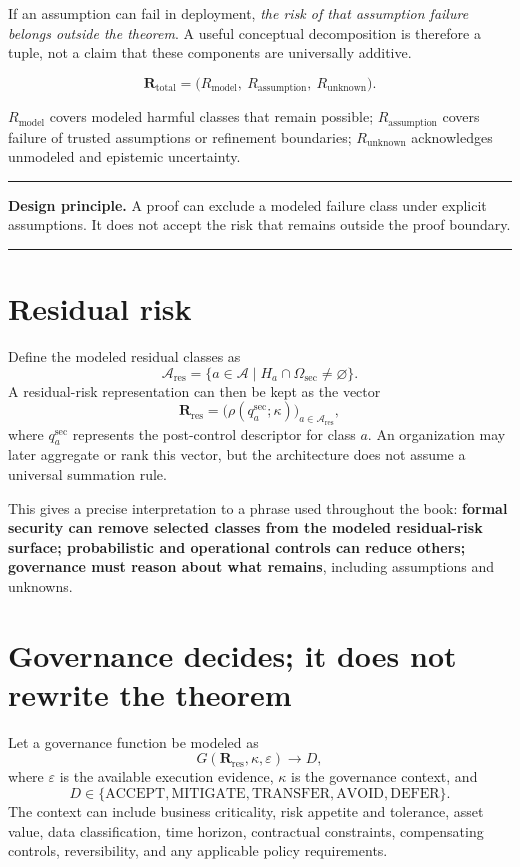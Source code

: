 \documentclass[10pt,oneside,openany]{book}
\newcommand{\principle}[1]{%
  \vspace{4pt}
  \noindent\begin{minipage}{\linewidth}
  \hrule\vspace{5pt}
  \small\sffamily\raggedright\textbf{Design principle.} #1
  \vspace{5pt}\hrule
  \end{minipage}\vspace{4pt}
}
\begin{document}
If an assumption can fail in deployment, \emph{the risk of that assumption failure belongs outside the theorem}. A useful conceptual decomposition is therefore a tuple, not a claim that these components are universally additive.
\begin{formulabox}
\[
\mathbf{R}_{\mathrm{total}}=\bigl(R_{\mathrm{model}},\ R_{\mathrm{assumption}},\ R_{\mathrm{unknown}}\bigr).
\]
\end{formulabox} $R_{\mathrm{model}}$ covers modeled harmful classes that remain possible; $R_{\mathrm{assumption}}$ covers failure of trusted assumptions or refinement boundaries; $R_{\mathrm{unknown}}$ acknowledges unmodeled and epistemic uncertainty.

\principle{A proof can exclude a modeled failure class under explicit assumptions. It does not accept the risk that remains outside the proof boundary.}

\section{Residual risk}

Define the modeled residual classes as
\[
\mathcal{A}_{\mathrm{res}}=\{a\in\mathcal{A}\mid H_a\cap\Omega_{\mathrm{sec}}\neq\varnothing\}.
\]
A residual-risk representation can then be kept as the vector
\[
\mathbf{R}_{\mathrm{res}}=\bigl(\rho(q_a^{\mathrm{sec}};\kappa)\bigr)_{a\in\mathcal{A}_{\mathrm{res}}},
\]
where $q_a^{\mathrm{sec}}$ represents the post-control descriptor for class $a$. An organization may later aggregate or rank this vector, but the architecture does not assume a universal summation rule.

This gives a precise interpretation to a phrase used throughout the book: \textbf{formal security can remove selected classes from the modeled residual-risk surface; probabilistic and operational controls can reduce others; governance must reason about what remains}, including assumptions and unknowns.

\section{Governance decides; it does not rewrite the theorem}

Let a governance function be modeled as
\[
G(\mathbf{R}_{\mathrm{res}},\kappa,\varepsilon)\rightarrow D,
\]
where $\varepsilon$ is the available execution evidence, $\kappa$ is the governance context, and
\[
D\in\{\mathrm{ACCEPT},\mathrm{MITIGATE},\mathrm{TRANSFER},\mathrm{AVOID},\mathrm{DEFER}\}.
\]
The context can include business criticality, risk appetite and tolerance, asset value, data classification, time horizon, contractual constraints, compensating controls, reversibility, and any applicable policy requirements.
\end{document}
